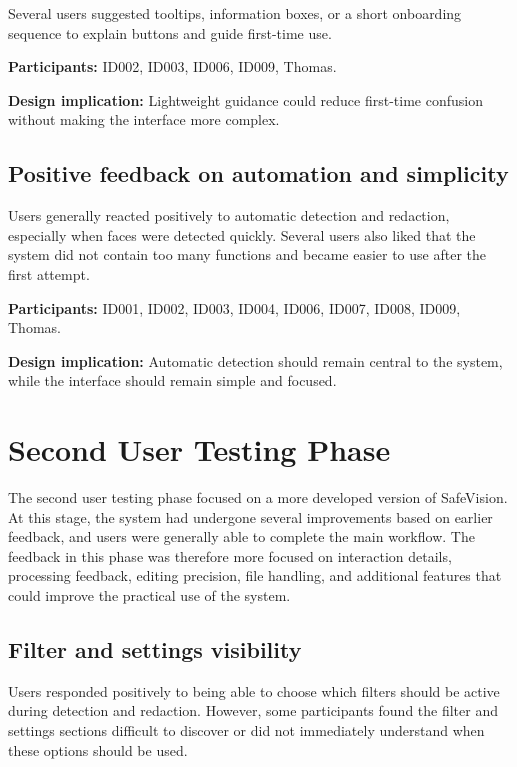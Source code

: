 Several users suggested tooltips, information boxes, or a short onboarding
sequence to explain buttons and guide first-time use.

\textbf{Participants:} ID002, ID003, ID006, ID009, Thomas.

\textbf{Design implication:} Lightweight guidance could reduce first-time
confusion without making the interface more complex.

\subsection*{Positive feedback on automation and simplicity}

Users generally reacted positively to automatic detection and redaction,
especially when faces were detected quickly. Several users also liked that the
system did not contain too many functions and became easier to use after the
first attempt.

\textbf{Participants:} ID001, ID002, ID003, ID004, ID006, ID007, ID008, ID009, Thomas.

\textbf{Design implication:} Automatic detection should remain central to the
system, while the interface should remain simple and focused.

\section{Second User Testing Phase}
\label{appendix:user_test_phase_2}

The second user testing phase focused on a more developed version of SafeVision.
At this stage, the system had undergone several improvements based on earlier
feedback, and users were generally able to complete the main workflow. The
feedback in this phase was therefore more focused on interaction details,
processing feedback, editing precision, file handling, and additional features
that could improve the practical use of the system.

\subsection*{Filter and settings visibility}

Users responded positively to being able to choose which filters should be
active during detection and redaction. However, some participants found the
filter and settings sections difficult to discover or did not immediately
understand when these options should be used.


